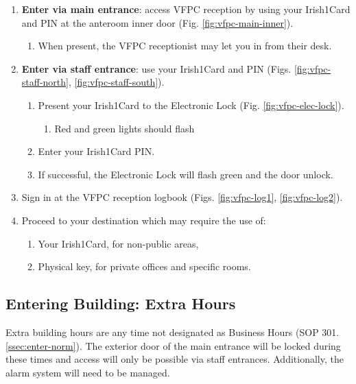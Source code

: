 \documentclass[11pt]{article}
\begin{document}
\begin{enumerate}
	\item \textbf{Enter via main entrance}: access VFPC reception by using your Irish1Card and PIN at the anteroom inner door (Fig. \ref{fig:vfpc-main-inner}).
	\begin{enumerate}
		\item When present, the VFPC receptionist may let you in from their desk.
	\end{enumerate}
	\item \textbf{Enter via staff entrance}: use your Irish1Card and PIN (Figs. \ref{fig:vfpc-staff-north}, \ref{fig:vfpc-staff-south}).
	\begin{enumerate}
		\item Present your Irish1Card to the Electronic Lock (Fig. \ref{fig:vfpc-elec-lock}).
		\begin{enumerate}
			\item Red and green lights should flash
		\end{enumerate}
		\item Enter your Irish1Card PIN.
		\item If successful, the Electronic Lock will flash green and the door unlock.
	\end{enumerate}
	\item Sign in at the VFPC reception logbook (Figs. \ref{fig:vfpc-log1}, \ref{fig:vfpc-log2}).
	\item Proceed to your destination which may require the use of:
	\begin{enumerate}
        \item Your Irish1Card, for non-public areas,
        \item Physical key, for private offices and specific rooms.
    \end{enumerate}
\end{enumerate}


\subsection{Entering Building: Extra Hours}
\label{ssec:enter-exnorm}

Extra building hours are any time not designated as Business Hours (SOP 301.\ref{ssec:enter-norm}). The exterior door of the main entrance will be locked during these times and access will only be possible via staff entrances. Additionally, the alarm system will need to be managed.\\
\end{document}
